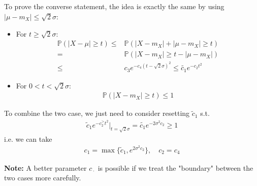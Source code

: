 \documentclass[11pt,a4paper]{ctexart}
\numberwithin{equation}{section}%
\begin{document}
\subsection{}
To prove the converse statement, the idea is exactly the same by using $ \left\vert \mu -m_X \right\vert \leq \sqrt{2}\sigma  $:
\begin{itemize}[topsep=2pt,itemsep=0pt]
    \item For $ t \geq \sqrt{2}\sigma  $:
    \begin{align*}
        \mathbb{P}\left( \left\vert X-\mu  \right\vert  \geq t \right) \leq & \mathbb{P}\left( \left\vert X-m_X  \right\vert + \left\vert \mu -m_X \right\vert \geq t \right)\\
        =& \mathbb{P}\left( \left\vert X-m_X  \right\vert \geq t-\left\vert \mu -m_X \right\vert  \right)\\
        \leq &c_3e^{-c_4(t-\sqrt{2}\sigma )^2} \leq \tilde{c_1} e^{-{c_2}t^2}
    \end{align*}
    \item For $ 0 < t < \sqrt{2}\sigma  $: 
    \begin{align*}
        \mathbb{P}\left( \left\vert X-m_X \right\vert  \geq t \right)  \leq 1
    \end{align*}
\end{itemize}
To combine the two case, we just need to consider resetting $ \tilde{c}_1 $ s.t.
\begin{align*}
    \tilde{c}_1e^{-c_2^{>}t^2}\Big|_{t=\sqrt{2}\sigma } = \tilde{c_1}e^{-2\sigma ^2c_2} \geq 1
\end{align*}
i.e. we can take
\begin{align*}
    c_1 = \max \{ \tilde{c}_1, e^{2\sigma ^2c_2} \} ,\quad c_2 = c_4 
\end{align*}

\textbf{Note:} A better parameter $ c_{\, \cdot \, } $ is possible if we treat the "boundary" between the two cases more carefully.

\section{}


\subsection{}
\end{document}
